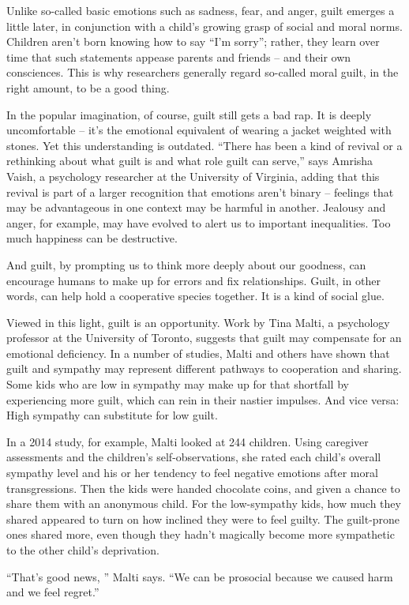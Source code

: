 Unlike so-called basic emotions such as sadness, fear, and anger, guilt emerges a little later, in conjunction with a child's growing grasp of social and moral norms. Children aren't born knowing how to say ``I'm sorry''; rather, they learn over time that such statements appease parents and friends – and their own consciences. This is why researchers generally regard so-called moral guilt, in the right amount, to be a good thing.


In the popular imagination, of course, guilt still gets a bad rap. It is deeply uncomfortable – it's the emotional equivalent of wearing a jacket weighted with stones. Yet this understanding is outdated. ``There has been a kind of revival or a rethinking about what guilt is and what role guilt can serve,'' says Amrisha Vaish, a psychology researcher at the University of Virginia, adding that this revival is part of a larger recognition that emotions aren't binary – feelings that may be advantageous in one context may be harmful in another. Jealousy and anger, for example, may have evolved to alert us to important inequalities. Too much happiness can be destructive.


And guilt, by prompting us to think more deeply about our goodness, can encourage humans to make up for errors and fix relationships. Guilt, in other words, can help hold a cooperative species together. It is a kind of social glue.


Viewed in this light, guilt is an opportunity. Work by Tina Malti, a psychology professor at the University of Toronto, suggests that guilt may compensate for an emotional deficiency. In a number of studies, Malti and others have shown that guilt and sympathy may represent different pathways to cooperation and sharing. Some kids who are low in sympathy may make up for that shortfall by experiencing more guilt, which can rein in their nastier impulses. And vice versa: High sympathy can substitute for low guilt.


In a 2014 study, for example, Malti looked at 244 children. Using caregiver assessments and the children's self-observations, she rated each child's overall sympathy level and his or her tendency to feel negative emotions after moral transgressions. Then the kids were handed chocolate coins, and given a chance to share them with an anonymous child. For the low-sympathy kids, how much they shared appeared to turn on how inclined they were to feel guilty. The guilt-prone ones shared more, even though they hadn't magically become more sympathetic to the other child's deprivation.


``That's good news, '' Malti says. ``We can be prosocial because we caused harm and we feel regret.''


